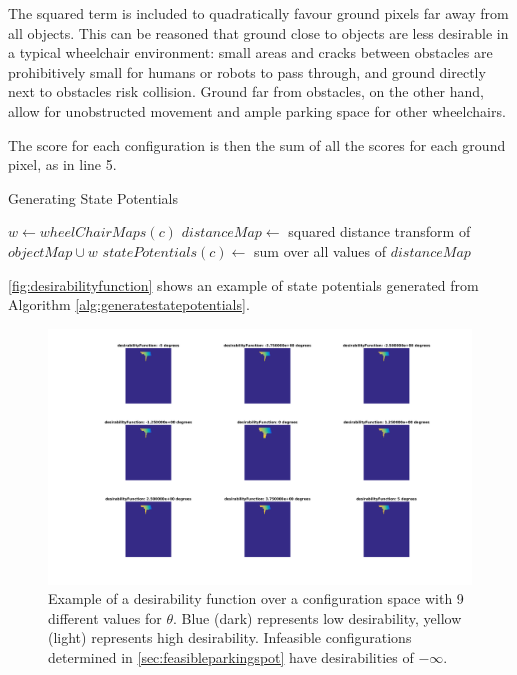 The squared term is included to quadratically favour ground pixels far
away from all objects. This can be reasoned that ground close to objects are less
desirable in a typical wheelchair environment: small areas and cracks between
obstacles are prohibitively small for humans or robots to pass through, and
ground directly next to obstacles risk collision. Ground far from obstacles, on
the other hand, allow for unobstructed movement and ample parking space for
other wheelchairs.

The score for each configuration is then the sum of all the scores for each
ground pixel, as in line 5.

\begin{algorithm}
\caption{Generating State Potentials}
\label{alg:generatestatepotentials}
\begin{algorithmic}[1]
\Statex
{}
        \State $w \gets wheelChairMaps(c)$
        \State $distanceMap \gets$ squared distance transform of $objectMap \cup w$
        \State $statePotentials(c) \gets$ sum over all values of $distanceMap$
    \EndFor
\EndFunction
\Statex
{}
\end{algorithmic}
\end{algorithm}

\autoref{fig:desirabilityfunction} shows an example of state potentials
generated from Algorithm \autoref{alg:generatestatepotentials}.

\begin{figure}
\centering
\includegraphics[width=6in]{figures/desirabilityfunction.png}
\caption{Example of a desirability function over a configuration space with 9
different values for $\theta$. Blue (dark) represents low desirability, yellow
(light) represents high desirability. Infeasible configurations determined in 
\autoref{sec:feasibleparkingspot} have desirabilities of $-\infty$.} 
\label{fig:desirabilityfunction}
\end{figure}


